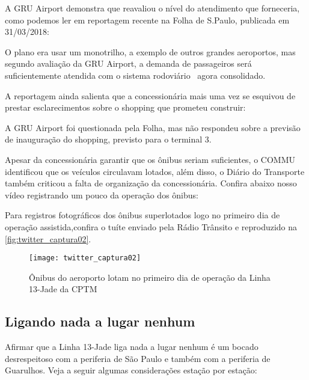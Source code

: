 \documentclass[11pt,fleqn]{book} %
\begin{document}
A GRU Airport demonstra que reavaliou o nível do atendimento que forneceria, como podemos ler em reportagem recente na Folha de S.Paulo, publicada em 31/03/2018:

\begin{citacao}
	O plano era usar um monotrilho, a exemplo de outros grandes aeroportos, mas segundo avaliação da GRU Airport, a demanda de passageiros será suficientemente atendida com o sistema rodoviário \textemdash\ agora consolidado.
\end{citacao}

A reportagem ainda salienta que a concessionária mais uma vez se esquivou de prestar esclarecimentos sobre o shopping que prometeu construir:

\begin{citacao}
	A GRU Airport foi questionada pela Folha, mas não respondeu sobre a previsão de inauguração do shopping, previsto para o terminal 3.
\end{citacao}

Apesar da concessionária garantir que os ônibus seriam suficientes, o COMMU identificou que os veículos circulavam lotados, além disso, o Diário do Transporte também criticou a falta de organização da concessionária. Confira abaixo nosso vídeo registrando um pouco da operação dos ônibus:


Para registros fotográficos dos ônibus superlotados logo no primeiro dia de operação assistida,confira o tuíte enviado pela Rádio Trânsito e reproduzido na \autoref{fig:twitter_captura02}.

\begin{figure}[htb]
	\caption[Ônibus lotados do aeroporto internacional]{Ônibus do aeroporto lotam no primeiro dia de operação da Linha 13-Jade da CPTM}
	\centering
	\texttt{[image: twitter\_captura02]}
	\label{fig:twitter_captura02}
\end{figure}

\subsection{Ligando nada a lugar nenhum}

Afirmar que a Linha 13-Jade liga nada a lugar nenhum é um bocado desrespeitoso com a periferia de São Paulo e também com a periferia de Guarulhos. Veja a seguir algumas considerações estação por estação:
\end{document}
